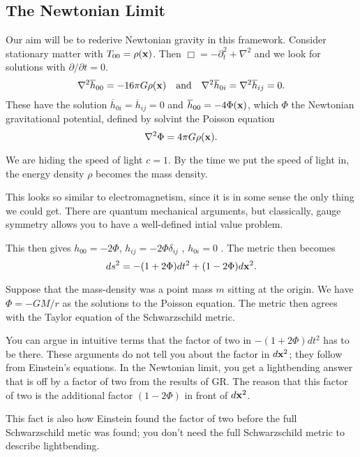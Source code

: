 \subsection{The Newtonian Limit}%
\label{sub:the_newtonian_limit}

Our aim will be to rederive Newtonian gravity in this framework.
Consider stationary matter with $T_{00} = \rho(\vb{x})$. Then $\Box = -\partial_t^2 + \nabla^2$ and we look for solutions with $\partial / \partial t = 0$. 
\begin{equation}
  \nabla^2 \overline{h}_{00} = -16 \pi G \rho(\vb{x}) \quad \text{and} \quad \nabla^2 \overline{h}_{0i} = \nabla^2 \overline{h}_{ij} = 0.
\end{equation}
These have the solution $\overline{h}_{0i} = \overline{h}_{ij} = 0$ and $\overline{h}_{00} = - 4 \Phi (\vb{x})$, which $\Phi$ the Newtonian gravitational potential, defined by solvint the Poisson equation
\begin{equation}
  \nabla^2 \Phi = 4 \pi G \rho(\vb{x}).
\end{equation}

\begin{remark}
  We are hiding the speed of light $c = 1$. By the time we put the speed of light in, the energy density $\rho$ becomes the mass density.
\end{remark}
\begin{remark}
  This looks so similar to electromagnetism, since it is in some sense the only thing we could get.
  There are quantum mechanical arguments, but classically, gauge symmetry allows you to have a well-defined intial value problem.
\end{remark}

This then gives $h_{00} = - 2 \Phi$, $h_{ij} = -2 \Phi \delta_{ij}$ , $h_{0i} = 0$ . 
The metric then becomes
\begin{equation}
  ds^2 = -(1 + 2 \Phi) dt^2 + (1 - 2 \Phi) d\vb{x}^2.
\end{equation}

\begin{example}[]
  Suppose that the mass-density was a point mass $m$ sitting at the origin.
  We have $\Phi = - G M /r$ as the solutions to the Poisson equation. The metric then agrees with the Taylor equation of the Schwarzschild metric.
\end{example}

\begin{remark}
  You can argue in intuitive terms that the factor of two in $-(1 + 2 \Phi)dt^2$ has to be there. These arguments do not tell you about the factor in $d\vb{x}^2$; they follow from Einstein's equations.
  In the Newtonian limit, you get a lightbending answer that is off by a factor of two from the results of GR.
  The reason that this factor of two is the additional factor $(1 - 2\Phi)$ in front of $d\vb{x}^2$.

  This fact is also how Einstein found the factor of two before the full Schwarzschild metic was found; you don't need the full Schwarzschild metric to describe lightbending.
\end{remark}

